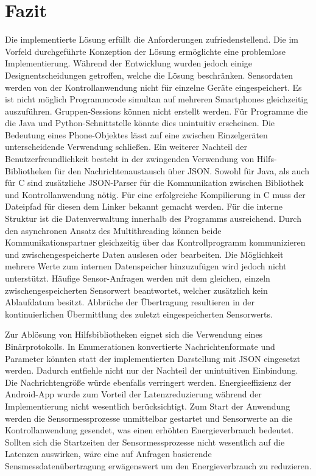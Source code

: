 \documentclass[11pt,a4paper]{report}
\begin{document}
\chapter{Fazit}\label{chap:fazit}
Die implementierte Lösung erfüllt die Anforderungen zufriedenstellend.
Die im Vorfeld durchgeführte Konzeption der Lösung ermöglichte eine problemlose Implementierung.
Während der Entwicklung wurden jedoch einige Designentscheidungen getroffen, welche die Lösung beschränken.
Sensordaten werden von der Kontrollanwendung nicht für einzelne Geräte eingespeichert.
Es ist nicht möglich Programmcode simultan auf mehreren Smartphones gleichzeitig auszuführen.
Gruppen-Sessions können nicht erstellt werden.
Für Programme die die Java und Python-Schnittstelle könnte dies unintuitiv erscheinen.
Die Bedeutung eines Phone-Objektes lässt auf eine zwischen Einzelgeräten unterscheidende Verwendung schließen.
Ein weiterer Nachteil der Benutzerfreundlichkeit besteht in der zwingenden Verwendung von Hilfs-Bibliotheken für den Nachrichtenaustausch über JSON.
Sowohl für Java, als auch für C sind zusätzliche JSON-Parser für die Kommunikation zwischen Bibliothek und Kontrollanwendung nötig.
Für eine erfolgreiche Kompilierung in C muss der Dateipfad für diesen dem Linker bekannt gemacht werden.
Für die interne Struktur ist die Datenverwaltung innerhalb des Programms ausreichend.
Durch den asynchronen Ansatz des Multithreading können beide Kommunikationspartner gleichzeitig über das Kontrollprogramm kommunizieren und zwischengespeicherte Daten auslesen oder bearbeiten.
Die Möglichkeit mehrere Werte zum internen Datenspeicher hinzuzufügen wird jedoch nicht unterstützt.
Häufige Sensor-Anfragen werden mit dem gleichen, einzeln zwischengespeicherten Sensorwert beantwortet, welcher zusätzlich kein Ablaufdatum besitzt.
Abbrüche der Übertragung resultieren in der kontinuierlichen Übermittlung des zuletzt eingespeicherten Sensorwerts.

Zur Ablösung von Hilfsbibliotheken eignet sich die Verwendung eines Binärprotokolls.
In Enumerationen konvertierte Nachrichtenformate und Parameter könnten statt der implementierten Darstellung mit JSON eingesetzt werden.
Dadurch entfiehle nicht nur der Nachteil der unintuitiven Einbindung.
Die Nachrichtengröße würde ebenfalls verringert werden.
Energieeffizienz der Android-App wurde zum Vorteil der Latenzreduzierung während der Implementierung nicht wesentlich berücksichtigt.
Zum Start der Anwendung werden die Sensormessprozesse unmittelbar gestartet und Sensorwerte an die Kontrollanwendung gesendet, was einen erhöhten Energieverbrauch bedeutet.
Sollten sich die Startzeiten der Sensormessprozesse nicht wesentlich auf die Latenzen auswirken, wäre eine auf Anfragen basierende Sensmessdatenübertragung erwägenswert um den Energieverbrauch zu reduzieren.
\end{document}
